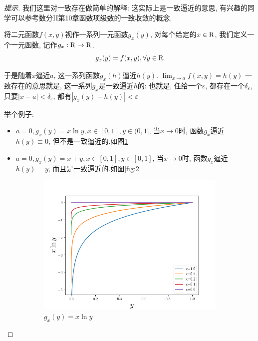 \documentclass[a4paper,12pt]{article}
\begin{document}
\begin{proof}[提示]
  我们这里对一致存在做简单的解释: 这实际上是一致逼近的意思, 有兴趣的同学可以参考数分II第10章函数项级数的一致收敛的概念.

  将二元函数$f(x,y)$视作一系列一元函数$g_x(y)$, 对每个给定的$x\in\mathrm{R}$, 
  我们定义一个一元函数, 记作$g_x:\mathrm{R}\to\mathrm{R}$, 
  \[g_x(y)=f(x,y),\forall y\in\mathrm{R}\]

  于是随着$x$逼近$a$, 这一系列函数$g_x(h)$逼近$h(y)$. $\lim_{x\to a}f(x,y)=h(y)$
  一致存在的意思就是, 这一系列$g_x$是一致逼近$h$的: 也就是, 任给一个$\varepsilon$, 
  都存在一个$\delta_\varepsilon$, 只要$|x-a|<\delta_\varepsilon$, 都有$|g_x(y)-h(y)|<\varepsilon$

  举个例子:
  \begin{itemize}
    \itemsep-0.5em 
    \item $a=0,g_x(y)=x\ln y,x\in[0,1],y\in(0,1]$, 当$x\to0$时, 函数$g_x$逼近$h(y)\equiv0$, 但不是一致逼近的.如图\ref{fig:1}
    \item $a=0,g_x(y)=x+y,x\in[0,1],y\in[0,1]$, 当$x\to 0$时, 函数$g_x$逼近$h(y)=y$, 而且是一致逼近的.如图\ref{fig:2}
  \end{itemize}
  \begin{figure}[htbp]
    \centering 
    \begin{subfigure}{0.45\textwidth}
      \includegraphics[width = \textwidth]{1.png}
      \caption{$g_x(y)=x\ln y$}
      \label{fig:1}
    \end{subfigure}
    \begin{subfigure}{0.45\textwidth}

\end{subfigure}
\end{figure}
\end{proof}
\end{document}
